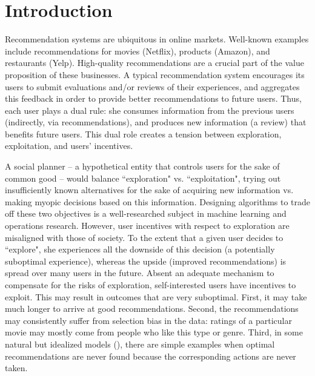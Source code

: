 \pagebreak
\section{Introduction}

Recommendation systems are ubiquitous in online markets. Well-known examples include recommendations for movies (\eg  Netflix), products (\eg  Amazon), and restaurants (\eg  Yelp).
High-quality recommendations are a crucial part of the value proposition of these businesses.
%
A typical recommendation system encourages its users to submit evaluations and/or reviews of their experiences, and aggregates this feedback in order to provide better recommendations to future users. Thus, each user plays a dual rule: she consumes information from the previous users (indirectly, via recommendations),
and produces new information (\eg  a review) that benefits future users. This dual role creates a tension between exploration, exploitation, and users' incentives.

A social planner -- a hypothetical entity that controls users for the sake of common good -- would balance ``exploration" vs.  ``exploitation", \ie  trying out insufficiently known alternatives for the sake of acquiring new information vs. making myopic decisions based on this information. Designing algorithms to trade off these two objectives is a well-researched subject in machine learning and operations research.
%
However, user incentives with respect to exploration are misaligned with those of society. To the extent that a given user decides to ``explore", she experiences all the downside of this decision (a potentially suboptimal experience), whereas the upside (improved recommendations) is spread over many users in the future. Absent an adequate mechanism to compensate for the risks of exploration, self-interested users have incentives to exploit. This may result in outcomes that are very suboptimal. First, it may take much longer to arrive at good recommendations. Second, the recommendations may consistently suffer from selection bias in the data: \eg  ratings of a particular movie may mostly come from people who like this type or genre. Third, in some natural but idealized models (\eg  \cite{Kremer-JPE14,ICexploration-ec15}), there are simple  examples when optimal recommendations are never found because the corresponding actions are never taken.

